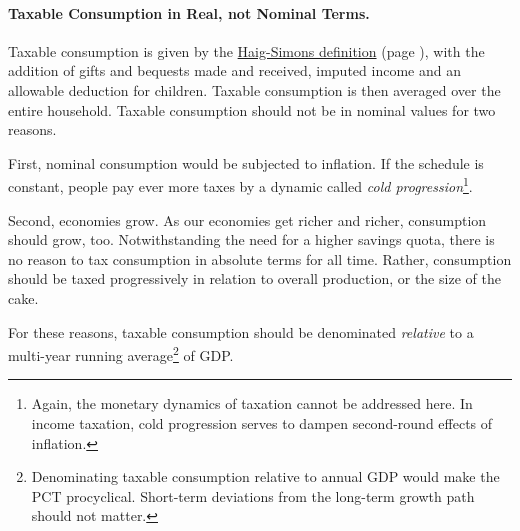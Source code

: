 \paragraph{Taxable Consumption in Real, not Nominal Terms.} Taxable consumption is given by the \hyperref[eq:HaigSimonsPCT]{Haig-Simons definition} (page \pageref{eq:HaigSimonsPCT}), with the addition of gifts and bequests made and received, imputed income and an allowable deduction for children. Taxable consumption is then averaged over the entire household. Taxable consumption should not be in nominal values for two reasons.

First, nominal consumption would be subjected to inflation. If the schedule is constant, people pay ever more taxes by a dynamic called \emph{cold progression}\footnote{
	Again, the monetary dynamics of taxation cannot be addressed here. In income taxation, cold progression serves to dampen second-round effects of inflation.}.

Second, economies grow. As our economies get richer and richer, consumption should grow, too. Notwithstanding the need for a higher savings quota, there is no reason to tax consumption in absolute terms for all time. Rather, consumption should be taxed progressively in relation to overall production, or the size of the cake.

For these reasons, taxable consumption should be denominated \emph{relative} to a multi-year running average\footnote{
	Denominating taxable consumption relative to annual GDP would make the PCT procyclical. Short-term deviations from the long-term growth path should not matter.}
of GDP.

